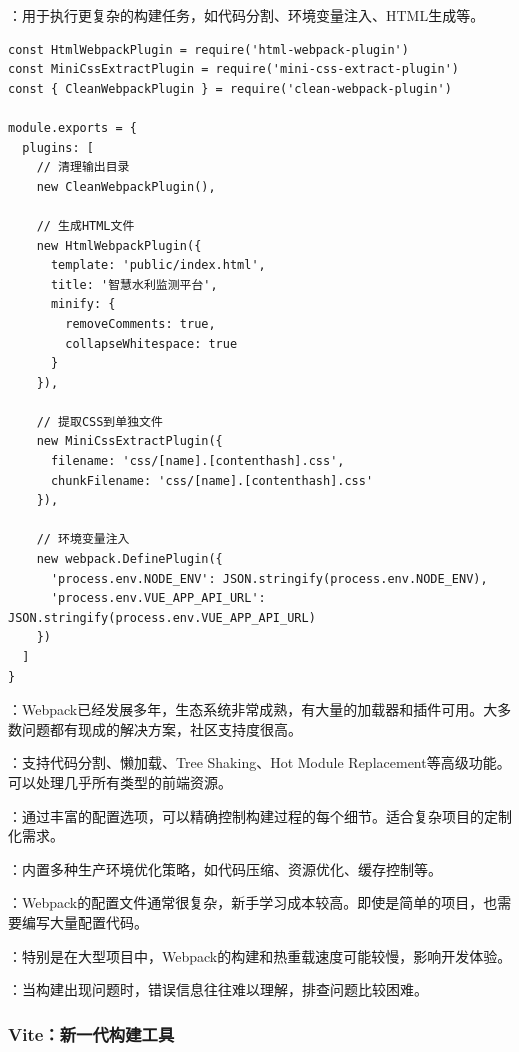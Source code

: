 ：用于执行更复杂的构建任务，如代码分割、环境变量注入、HTML生成等。

\begin{lstlisting}[style=javascript]
const HtmlWebpackPlugin = require('html-webpack-plugin')
const MiniCssExtractPlugin = require('mini-css-extract-plugin')
const { CleanWebpackPlugin } = require('clean-webpack-plugin')

module.exports = {
  plugins: [
    // 清理输出目录
    new CleanWebpackPlugin(),
    
    // 生成HTML文件
    new HtmlWebpackPlugin({
      template: 'public/index.html',
      title: '智慧水利监测平台',
      minify: {
        removeComments: true,
        collapseWhitespace: true
      }
    }),
    
    // 提取CSS到单独文件
    new MiniCssExtractPlugin({
      filename: 'css/[name].[contenthash].css',
      chunkFilename: 'css/[name].[contenthash].css'
    }),
    
    // 环境变量注入
    new webpack.DefinePlugin({
      'process.env.NODE_ENV': JSON.stringify(process.env.NODE_ENV),
      'process.env.VUE_APP_API_URL': JSON.stringify(process.env.VUE_APP_API_URL)
    })
  ]
}
\end{lstlisting}


：Webpack已经发展多年，生态系统非常成熟，有大量的加载器和插件可用。大多数问题都有现成的解决方案，社区支持度很高。

：支持代码分割、懒加载、Tree Shaking、Hot Module Replacement等高级功能。可以处理几乎所有类型的前端资源。

：通过丰富的配置选项，可以精确控制构建过程的每个细节。适合复杂项目的定制化需求。

：内置多种生产环境优化策略，如代码压缩、资源优化、缓存控制等。


：Webpack的配置文件通常很复杂，新手学习成本较高。即使是简单的项目，也需要编写大量配置代码。

：特别是在大型项目中，Webpack的构建和热重载速度可能较慢，影响开发体验。

：当构建出现问题时，错误信息往往难以理解，排查问题比较困难。

\hypertarget{viteux65b0ux4e00ux4ee3ux6784ux5efaux5de5ux5177}{%
\subsubsection{Vite：新一代构建工具}\label{viteux65b0ux4e00ux4ee3ux6784ux5efaux5de5ux5177}}

